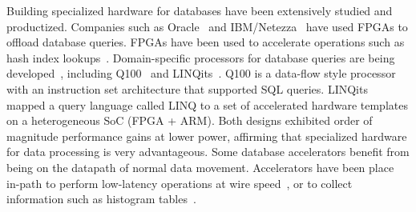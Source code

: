 Building specialized hardware for databases have been extensively studied and
productized. Companies such as Oracle~\cite{exadata} and
IBM/Netezza~\cite{netezza} have used FPGAs to offload database queries.
FPGAs have been used to accelerate operations such as hash index
lookups~\cite{walkers}. Domain-specific processors for database queries are
being developed~\cite{databasefpga, hybridsql}, including Q100~\cite{q100} and LINQits~\cite{linqits}.
Q100 is a data-flow style processor with an instruction set architecture that
supported SQL queries. LINQits mapped a query language called LINQ to a set of
accelerated hardware templates on a heterogeneous SoC (FPGA + ARM). Both designs
exhibited order of magnitude performance gains at lower power, affirming that
specialized hardware for data processing is very advantageous.
Some database accelerators benefit from being on the datapath of normal data
movement. Accelerators have been place in-path to perform low-latency operations
at wire speed~\cite{fpgastreamquery}, or to collect information such as
histogram tables~\cite{histogramssideeffect}.

